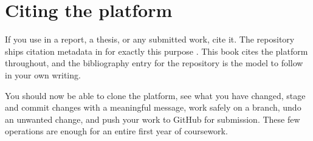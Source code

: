 \section{Citing the platform}

If you use \prg in a report, a thesis, or any submitted work, cite it. The
repository ships citation metadata in  for exactly this purpose
\citep{prg32repo}. This book cites the platform throughout, and the bibliography
entry for the repository is the model to follow in your own writing.

\begin{prgcheck}
You should now be able to clone the platform, see what you have changed, stage and
commit changes with a meaningful message, work safely on a branch, undo an
unwanted change, and push your work to GitHub for submission. These few operations
are enough for an entire first year of coursework.
\end{prgcheck}
